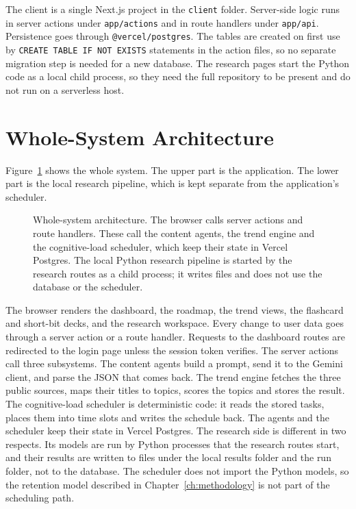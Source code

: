 The client is a single Next.js project in the \texttt{client} folder. Server-side logic runs in server actions under \texttt{app/actions} and in route handlers under \texttt{app/api}. Persistence goes through \texttt{@vercel/postgres}. The tables are created on first use by \texttt{CREATE TABLE IF NOT EXISTS} statements in the action files, so no separate migration step is needed for a new database. The research pages start the Python code as a local child process, so they need the full repository to be present and do not run on a serverless host.

\section{Whole-System Architecture}
\label{sec:axiom-architecture}

Figure~\ref{fig:tk_axiom_architecture} shows the whole system. The upper part is the application. The lower part is the local research pipeline, which is kept separate from the application's scheduler.

\begin{figure}[htbp]
  \centering
  
  \caption{Whole-system architecture. The browser calls server actions and route handlers. These call the content agents, the trend engine and the cognitive-load scheduler, which keep their state in Vercel Postgres. The local Python research pipeline is started by the research routes as a child process; it writes files and does not use the database or the scheduler.}
  \label{fig:tk_axiom_architecture}
\end{figure}

The browser renders the dashboard, the roadmap, the trend views, the flashcard and short-bit decks, and the research workspace. Every change to user data goes through a server action or a route handler. Requests to the dashboard routes are redirected to the login page unless the session token verifies. The server actions call three subsystems. The content agents build a prompt, send it to the Gemini client, and parse the JSON that comes back. The trend engine fetches the three public sources, maps their titles to topics, scores the topics and stores the result. The cognitive-load scheduler is deterministic code: it reads the stored tasks, places them into time slots and writes the schedule back. The agents and the scheduler keep their state in Vercel Postgres. The research side is different in two respects. Its models are run by Python processes that the research routes start, and their results are written to files under the local results folder and the run folder, not to the database. The scheduler does not import the Python models, so the retention model described in Chapter~\ref{ch:methodology} is not part of the scheduling path.

